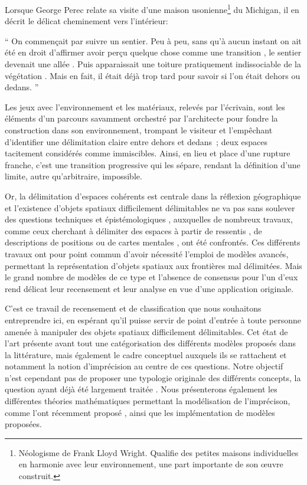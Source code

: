Lorsque George Perec relate sa visite d’une maison usonienne\footnote{
  Néologisme de Frank Lloyd Wright. Qualifie des petites maisons
  individuelles en harmonie avec leur environnement, une part
  importante de son œuvre construit.} du Michigan, il en décrit le
délicat cheminement vers l’intérieur:

\begin{displayquote}[Perec, 1974, pp. 52-53]
  \enquote{%
    On commençait par suivre un sentier\textelp{}. Peu à peu,
    \textelp{} sans qu’à aucun instant on ait été en droit d’affirmer
    avoir perçu quelque chose comme une transition \textelp{}, le
    sentier devenait \textelp{} une allée \textelp{}. Puis
    apparaissait \textelp{} une toiture \textelp{} pratiquement
    indissociable de la végétation \textelp{}. Mais en fait, il était
    déjà trop tard pour savoir si l’on était dehors ou dedans.%
  }
\end{displayquote}

Les jeux avec l’environnement et les matériaux, relevés par
l’écrivain, sont les éléments d’un parcours savamment orchestré par
l’architecte pour fondre la construction dans son environnement,
trompant le visiteur et l’empêchant d’identifier une délimitation
claire entre dehors et dedans ; deux espaces tacitement considérés
comme immiscibles. Ainsi, en lieu et place d’une rupture franche,
c’est une transition progressive qui les sépare, rendant la définition
d’une limite, autre qu’arbitraire, impossible.

Or, la délimitation d’espaces cohérents est centrale dans la réflexion
géographique et l’existence d’objets spatiaux difficilement
délimitables ne va pas sans soulever des questions techniques et
épistémologiques \autocite{Burrough1996b}, auxquelles de nombreux
travaux, comme ceux cherchant à délimiter des espaces à partir de
ressentis \autocite{Arabacioglu2010}, de descriptions de positions
\autocite{Jones2007, Wolter2018,Bunel2019} ou de cartes mentales
\autocite{Dutozia2014}, ont été confrontés. Ces différents travaux ont
pour point commun d’avoir nécessité l’emploi de modèles avancés,
permettant la représentation d’objets spatiaux aux frontières mal
délimitées. Mais le grand nombre de modèles de ce type et l’absence de
consensus pour l’un d’eux rend délicat leur recensement et leur
analyse en vue d’une application originale.

C’est ce travail de recensement et de classification que nous
souhaitons entreprendre ici, en espérant qu’il puisse servir de point
d’entrée à toute personne amenée à manipuler des objets spatiaux
difficilement délimitables.  Cet état de l’art présente avant tout une
catégorisation des différents modèles proposés dans la littérature,
mais également le cadre conceptuel auxquels ils se rattachent et
notamment la notion d’imprécision au centre de ces questions. Notre
objectif n’est cependant pas de proposer une typologie originale des
différents concepts, la question ayant déjà été largement traitée
\autocite{Bouchon-Meunier1995,Fisher2006,Devillers2019}. Nous
présenterons également les différentes théories mathématiques
permettant la modélisation de l’imprécison, comme l’ont récemment
proposé \autocite{Batton-Hubert2019}, ainsi que les implémentation de
modèles proposées.

